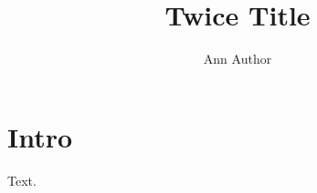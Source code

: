 \documentclass{article}
\title{Twice Title}\author{Ann Author}
\begin{document}
\begin{center}\@title\end{center}
\begin{center}\end{center}
\begin{center}\@title{}\end{center}
\begin{center}\@title\end{center}
\maketitle
\section{Intro}
Text.
\end{document}
